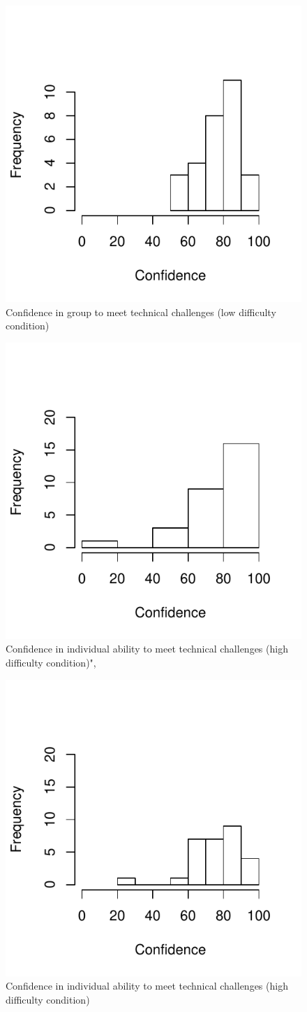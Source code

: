 \begin{figure}
  \centering
  \includegraphics[width=0.5\linewidth,keepaspectratio] {images/histLowGroupConfidence-1}
  \caption{Confidence in group to meet technical challenges (low difficulty condition)}
  \label{fig:histLowGroupConfidence}
\end{figure}

\begin{figure}
  \centering
  \includegraphics[width=0.5\linewidth,keepaspectratio] {images/histHighIndConfidence-1}
  \caption{Confidence in individual ability to meet technical challenges (high difficulty condition)",}
  \label{fig:histHighIndConfidence}
\end{figure}

\begin{figure}
  \centering
  \includegraphics[width=0.5\linewidth,keepaspectratio] {images/histLowIndConfidence-1}
  \caption{Confidence in individual ability to meet technical challenges (high difficulty condition)}
  \label{fig:histLowIndConfidence}
\end{figure}

